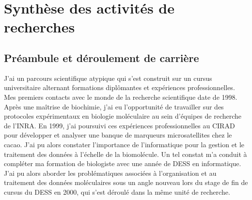 \chapter{Synthèse des activités de recherches} %

\label{synthese} %

\section{Préambule et déroulement de carrière}
J’ai un parcours scientifique atypique qui s’est construit sur un cursus universitaire alternant formations diplômantes et expériences professionnelles. Mes premiers contacts avec le monde de la recherche scientifique date de 1998. Après une maîtrise de biochimie, j’ai eu l’opportunité de travailler sur des protocoles expérimentaux en biologie moléculaire au sein d’équipes de recherche de l’INRA. En 1999, j’ai poursuivi ces expériences professionnelles au CIRAD pour développer et analyser une banque de marqueurs microsatellites chez le cacao. J’ai pu alors constater l’importance de l’informatique pour la gestion et le traitement des données à l’échelle de la biomolécule. Un tel constat m’a conduit à compléter ma formation de biologiste avec une année de DESS en informatique. J’ai pu alors aborder les problématiques associées à l’organisation et au traitement des données moléculaires sous un angle nouveau lors du stage de fin de cursus du DESS en 2000, qui s’est déroulé dans la même unité de recherche. \\

